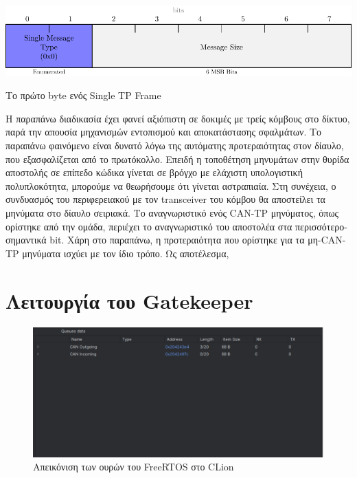 \documentclass[a4paper,nobib,justified]{tufte-book}
\begin{document}
\begin{marginfigure}
	\includegraphics[width=1\textwidth]{media/diagrams/tp-messages/single-message-first-byte.pdf}
	\label{fig:tp-single-frame-first-byte}
	\caption{Το πρώτο byte ενός Single TP Frame}
\end{marginfigure}

\FloatBarrier
Η παραπάνω διαδικασία έχει φανεί αξιόπιστη σε δοκιμές με τρείς κόμβους στο δίκτυο, παρά την απουσία μηχανισμών εντοπισμού και αποκατάστασης σφαλμάτων. Το παραπάνω φαινόμενο είναι δυνατό λόγω της αυτόματης προτεραιότητας στον δίαυλο, που εξασφαλίζεται από το πρωτόκολλο. Επειδή η τοποθέτηση μηνυμάτων στην θυρίδα αποστολής σε επίπεδο κώδικα γίνεται σε βρόγχο με ελάχιστη υπολογιστική πολυπλοκότητα, μπορούμε να θεωρήσουμε ότι γίνεται αστραπιαία. Στη συνέχεια, ο συνδυασμός του περιφερειακού με τον transceiver του κόμβου θα αποστείλει τα μηνύματα στο δίαυλο σειριακά. Το αναγνωριστικό ενός CAN-TP μηνύματος, όπως ορίστηκε από την ομάδα, περιέχει το αναγνωριστικό του αποστολέα στα περισσότερο-σημαντικά bit. Χάρη στο παραπάνω, η προτεραιότητα που ορίστηκε για τα μη-CAN-TP μηνύματα ισχύει με τον ίδιο τρόπο. Ως αποτέλεσμα, 

\clearpage
\section{Λειτουργία του Gatekeeper}
\label{sec:gatekeeper}

\begin{figure}
	\centering
	\includegraphics[width=0.8\linewidth]{media/images/clion-queues.pdf}
	\caption{Απεικόνιση των ουρών του FreeRTOS στο CLion}
	\label{fig:clion-queues}
\end{figure}
\end{document}
